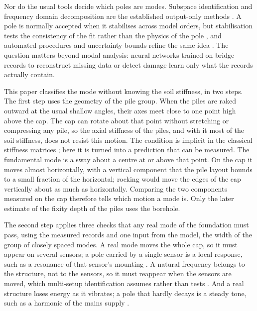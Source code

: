 \documentclass[11pt]{article}
\begin{document}
Nor do the usual tools decide which poles are modes. Subspace identification \cite{overschee1996,peeters1999} and frequency domain decomposition \cite{brincker2001} are the established output-only methods \cite{reynders2012}. A pole is normally accepted when it stabilises across model orders, but stabilisation tests the consistency of the fit rather than the physics of the pole \cite{peeters2001rev,zhang2005}, and automated procedures and uncertainty bounds refine the same idea \cite{magalhaes2009,reynders2012aoma,reynders2008}. The question matters beyond modal analysis: neural networks trained on bridge records to reconstruct missing data \cite{nhung2024} or detect damage \cite{nguyen2025ec} learn only what the records actually contain.

This paper classifies the mode without knowing the soil stiffness, in two steps. The first step uses the geometry of the pile group. When the piles are raked outward at the usual shallow angles, their axes meet close to one point high above the cap. The cap can rotate about that point without stretching or compressing any pile, so the axial stiffness of the piles, and with it most of the soil stiffness, does not resist this motion. The condition is implicit in the classical stiffness matrices \cite{hrennikoff1950,saul1968}; here it is turned into a prediction that can be measured. The fundamental mode is a sway about a centre at or above that point. On the cap it moves almost horizontally, with a vertical component that the pile layout bounds to a small fraction of the horizontal; rocking would move the edges of the cap vertically about as much as horizontally. Comparing the two components measured on the cap therefore tells which motion a mode is. Only the later estimate of the fixity depth of the piles uses the borehole.

The second step applies three checks that any real mode of the foundation must pass, using the measured records and one input from the model, the width of the group of closely spaced modes. A real mode moves the whole cap, so it must appear on several sensors; a pole carried by a single sensor is a local response, such as a resonance of that sensor's mounting \cite{shokrollahi2017,abdelnour2024}. A natural frequency belongs to the structure, not to the sensors, so it must reappear when the sensors are moved, which multi-setup identification assumes rather than tests \cite{mevel2002,dohler2013ms}. And a real structure loses energy as it vibrates; a pole that hardly decays is a steady tone, such as a harmonic of the mains supply \cite{mohanty2004,jacobsen2005,motte2015}.
\end{document}

